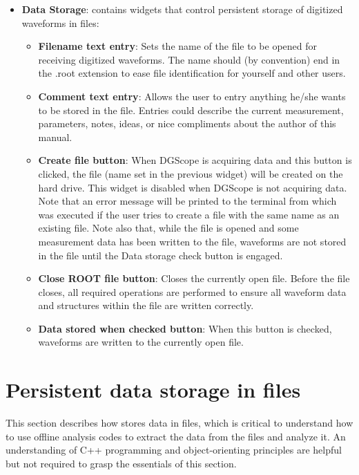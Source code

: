 \begin{itemize}
{\begin{itemize}
{        end in an integer that is incremented if the user attempts to
        create image files of the same name.}
    \end{itemize}
  }
  \item{\textbf{Data Storage}: contains widgets that control
    persistent storage of digitized waveforms in \ROOT files:
    \begin{itemize}
      \item{\textbf{Filename text entry}: Sets the name of the \ROOT
        file to be opened for receiving digitized waveforms. The name
        should (by convention) end in the .root extension to ease file
        identification for yourself and other users.}
      \item{\textbf{Comment text entry}: Allows the user to entry
        anything he/she wants to be stored in the \ROOT file. Entries
        could describe the current measurement, parameters, notes,
        ideas, or nice compliments about the author of this manual.}
      \item{\textbf{Create \ROOT file button}: When DGScope is
        acquiring data and this button is clicked, the \ROOT file
        (name set in the previous widget) will be created on the hard
        drive. This widget is disabled when DGScope is not acquiring
        data. Note that an error message will be printed to the
        terminal from which \ADAQ was executed if the
        user tries to create a \ROOT file with the same name as an
        existing \ROOT file. Note also that, while the file is opened
        and some measurement data has been written to the \ROOT file,
        waveforms are not stored in the file until the Data storage
        check button is engaged.}
      \item{\textbf{Close ROOT file button}: Closes the currently open
        \ROOT file. Before the file closes, all required \ROOT
        operations are performed to ensure all waveform data and
        structures within the file are written correctly.}
      \item{\textbf{Data stored when checked button}: When this button
        is checked, waveforms are written to the currently open \ROOT
        file.}
    \end{itemize}
  }
\end{itemize}
    
    
\section{Persistent data storage in \ROOT files}
\label{sec:datastorage}
This section describes how \ADAQ stores data in \ROOT
files, which is critical to understand how to use offline analysis
codes to extract the data from the \ROOT files and analyze it. An
understanding of C++ programming and object-orienting principles are
helpful but not required to grasp the essentials of this section.

